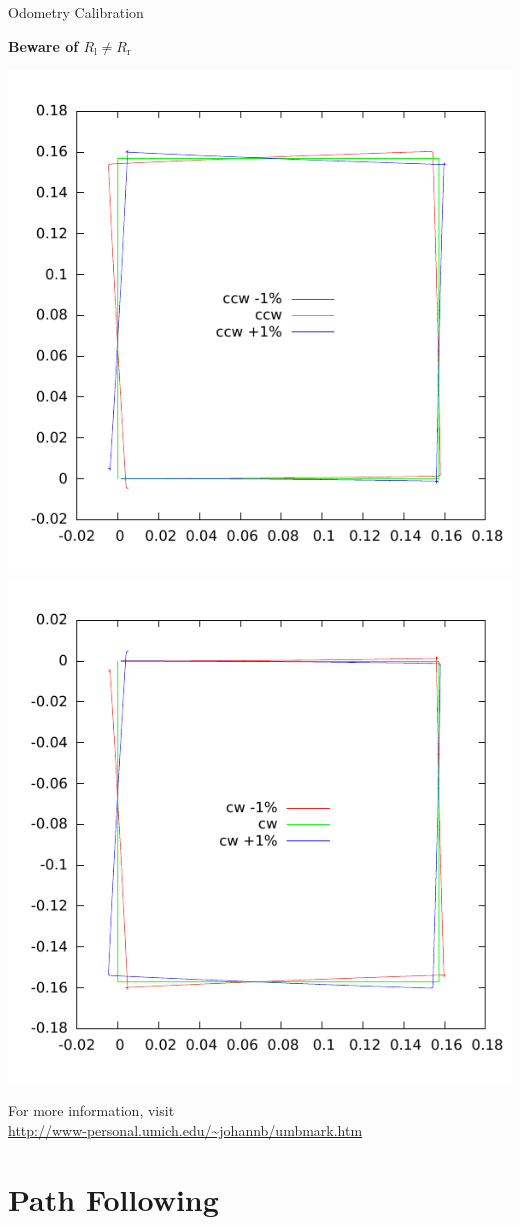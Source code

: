 \documentclass{beamer}
\begin{document}
\begin{frame}{Odometry Calibration}
  
  \textbf{Beware of $R_\text{l} \ne R_\text{r}$}
  
  \vfill
  
  \includegraphics[width=0.5\columnwidth]{odom-ccw.pdf}%
  \includegraphics[width=0.5\columnwidth]{odom-cw.pdf}
  
  \vfill
  For more information, visit\\
  \url{http://www-personal.umich.edu/~johannb/umbmark.htm}
  
\end{frame}  


\section{Path Following}
\end{document}
